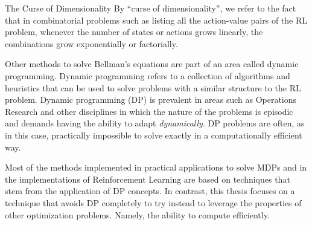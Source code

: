 \begin{remark}{The Curse of Dimensionality}
	By ``curse of dimensionality'', we refer to the fact that in combinatorial
	problems such as listing all the action-value pairs of the RL problem,
	whenever the number of states or actions grows linearly, the combinations
	grow exponentially or factorially.
\end{remark}

Other methods to solve Bellman's equations are part of an area called dynamic
programming. Dynamic programming refers to a collection of algorithms and
heuristics that can be used to solve problems with a similar structure to the RL
problem. Dynamic programming (DP) is prevalent in areas such as Operations
Research and other disciplines in which the nature of the problems is episodic
and demands having the ability to adapt \textit{dynamically}. DP problems are
often, as in this case, practically impossible to solve exactly in a
computationally efficient way.

Most of the methods implemented in practical applications to solve MDPs and in
the implementations of Reinforcement Learning are based on techniques that stem
from the application of DP concepts. In contrast, this thesis focuses on a
technique that avoids DP completely to try instead to leverage the properties of
other optimization problems. Namely, the ability to compute efficiently.